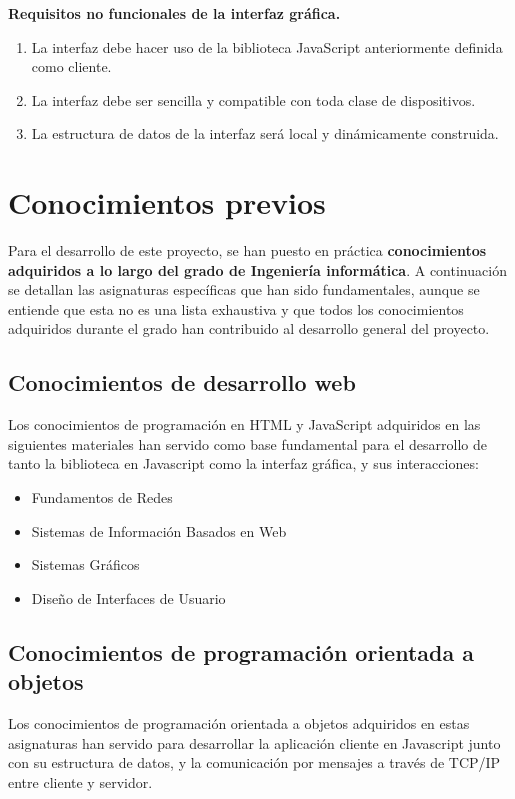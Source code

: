 \textbf{Requisitos no funcionales de la interfaz gráfica.}

\begin{enumerate}[label=\textbf{R2.2.\arabic*.}, leftmargin=10mm]
  \item La interfaz debe hacer uso de la biblioteca JavaScript anteriormente definida como cliente.
  \item La interfaz debe ser sencilla y compatible con toda clase de dispositivos.
  \item La estructura de datos de la interfaz será local y dinámicamente construida.
  
\end{enumerate}


\section{Conocimientos previos}

Para el desarrollo de este proyecto, se han puesto en práctica \textbf{conocimientos adquiridos a lo largo del grado de Ingeniería informática}. A continuación se detallan las asignaturas específicas que han sido fundamentales, aunque se entiende que esta no es una lista exhaustiva y que todos los conocimientos adquiridos durante el grado han contribuido al desarrollo general del proyecto.

\subsection{Conocimientos de desarrollo web}
Los conocimientos de programación en HTML y JavaScript adquiridos en las siguientes materiales han servido como base fundamental para el desarrollo de tanto la biblioteca en Javascript como la interfaz gráfica, y sus interacciones:

\begin{itemize}
	\item Fundamentos de Redes
	\item Sistemas de Información Basados en Web
	\item Sistemas Gráficos
	\item Diseño de Interfaces de Usuario
\end{itemize}


\subsection{Conocimientos de programación orientada a objetos}
Los conocimientos de programación orientada a objetos adquiridos en estas asignaturas han servido para desarrollar la aplicación cliente en Javascript junto con su estructura de datos, y la comunicación por mensajes a través de TCP/IP entre cliente y servidor. 

